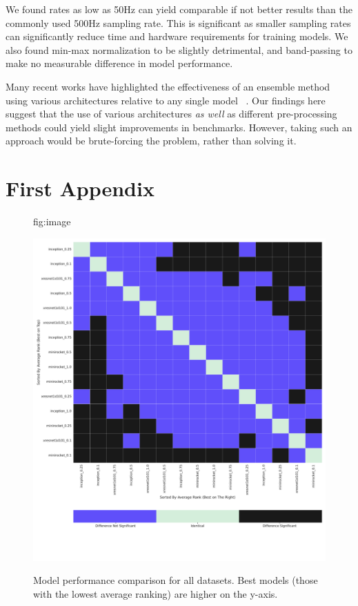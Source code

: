 \documentclass[pmlr,twocolumn]{jmlr}%
\begin{document}
We found rates as low as 50Hz can yield comparable if not better results than the commonly used 500Hz sampling rate. This is significant as smaller sampling rates can significantly reduce time and hardware requirements for training models. We also found min-max normalization to be slightly detrimental, and band-passing to make no measurable difference in model performance.

Many recent works have highlighted the effectiveness of an ensemble method using various architectures relative to any single model ~\citep{uwaechia2021comprehensive,hong2022practical,IsmailFawaz2018deep,strodthoff2020deep,chen2020detection}. Our findings here suggest that the use of various architectures \textit{as well} as different pre-processing methods could yield slight improvements in benchmarks. However, taking such an approach would be brute-forcing the problem, rather than solving it. 



\appendix
\section{First Appendix}\label{apd:model_vs_model}
\begin{figure}[tbp]
\floatconts
  {fig:image}
  {\caption{Model performance comparison for all datasets. Best models (those with the lowest average ranking) are higher on the y-axis.}}
  {\includegraphics[width=1\linewidth]{images/model_comparisons_alldatasets.pdf}}
 
\end{figure}
\end{document}
